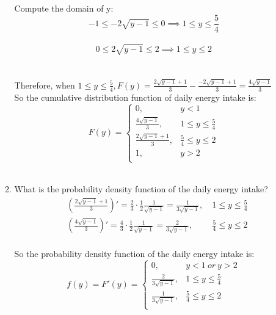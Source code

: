 \documentclass[11pt]{article}
\begin{document}
\begin{enumerate}[label=\textbf{Question \arabic*:},start=1]
\begin{enumerate}
	Compute the domain of y:\\
	$$ -1 \leq -2\sqrt{y-1} \leq 0 \implies 1 \leq y \leq \frac{5}{4} $$ \\
	$$ 0 \leq 2 \sqrt{y-1} \leq 2  \implies 1 \leq y \leq 2$$ \\
	\\
	Therefore, when $1 \leq y \leq \frac{5}{4}, F(y) = \frac{2\sqrt{y-1}+1}{3} - \frac{-2\sqrt{y-1}+1}{3} = \frac{4\sqrt{y-1}}{3}$ \\
	So the cumulative distribution function of daily energy intake is:\\
	$$F(y) = \begin{cases}
		0, & y < 1 \\
		\frac{4 \sqrt{y-1}}{3}, & 1 \leq y \le \frac{5}{4} \\
		\frac{ 2\sqrt{y-1} + 1}{3}, & \frac{5}{4} \le y \leq 2\\
		1, & y > 2 \\
		\end{cases}$$\\
	
	\item What is the probability density function of the daily energy intake?\\
	\begin{align*}
& (\frac{ 2\sqrt{y-1} + 1}{3})' = \frac{2}{3} \cdot \frac{1}{2} \frac{1}{\sqrt{y-1}}= \frac{1}{ 3\sqrt{y-1}}, &\ 1 \leq y \le \frac{5}{4} \\
& (\frac{4 \sqrt{y-1}}{3})' = \frac{4}{3} \cdot \frac{1}{2} \frac{1}{\sqrt{y-1}} = \frac{2}{3 \sqrt{y-1}}, & \ \frac{5}{4} \le y \leq 2
	\end{align*}\\
	So the probability density function of the daily energy intake is:
	$$f(y) = F'(y) = \begin{cases}
		0, & y < 1\ or\ y > 2\\
		\frac{2}{3 \sqrt{y-1}}, & 1 \leq y \le \frac{5}{4} \\
		\frac{1}{ 3\sqrt{y-1}}, & \frac{5}{4} \le y \leq 2\\
		\end{cases}$$\\


\end{enumerate}
\end{enumerate}
\end{document}
